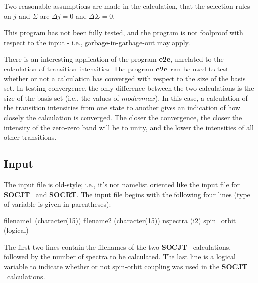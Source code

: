 \documentclass{article}
\newcommand{\socjt}{{\bf SOCJT }}
\newcommand{\socrt}{{\bf SOCRT}}
\newcommand{\etoe}{{\bf e2e}}
\begin{document}
Two reasonable assumptions are made in the calculation, that the
selection rules on $j$ and $\Sigma $ are $\Delta j = 0$ and $\Delta
\Sigma = 0$. 

This program has not been fully tested, and the program is not
foolproof with respect to the input - i.e., garbage-in-garbage-out may
apply.  

There is an interesting application of the program \etoe , unrelated
to the calculation of transition intensities. The program \etoe\ can
be used to test whether or not a calculation has converged with
respect to the size of the basis set. In testing convergence, the only
difference between the two calculations is the size of the basis set
(i.e., the values of $modevmax$). In this case, a calculation of the
transition intensities from one state to another gives an indication
of how closely the calculation is converged. The closer the
convergence, the closer the intensity of the zero-zero band will be to
unity, and the lower the intensities of all other transitions.

\subsection{Input}

The input file is old-style; i.e., it's not namelist oriented like the
input file for \socjt\ and \socrt.  The input file begins with the
following four lines (type of variable is given in parentheses): 
\begin{verbatim*}
filename1 (character(15))
filename2 (character(15))
nspectra (i2)
spin_orbit (logical)
\end{verbatim*}
The first two lines contain the filenames of the two \socjt\
calculations, followed by the number of spectra to be calculated. The
last line is a logical variable to indicate whether or not spin-orbit
coupling was used in the \socjt\ calculations.
\end{document}
